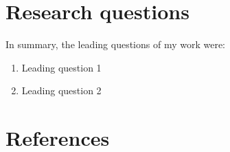 \documentclass[%
a4paper,12pt,ngerman,UKenglish,twoside]{book}
\begin{document}
\begin{refsection}
\section{Research questions}
In summary, the leading questions of my work were:
\begin{enumerate}[label=(\roman*)]
\item Leading question 1
\item Leading question 2
\end{enumerate}

\section{References}
\printbibliography[heading=none]
\end{refsection}

\end{document}
